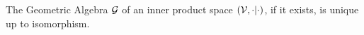 \begin{theorem}[Uniqueness]\label{t:uniqueness}
	The Geometric Algebra $\mathcal{G}$ of an inner product space $(\mathcal{V}, \cdot|\cdot)$, if it exists, is unique up to isomorphism.
\end{theorem}
